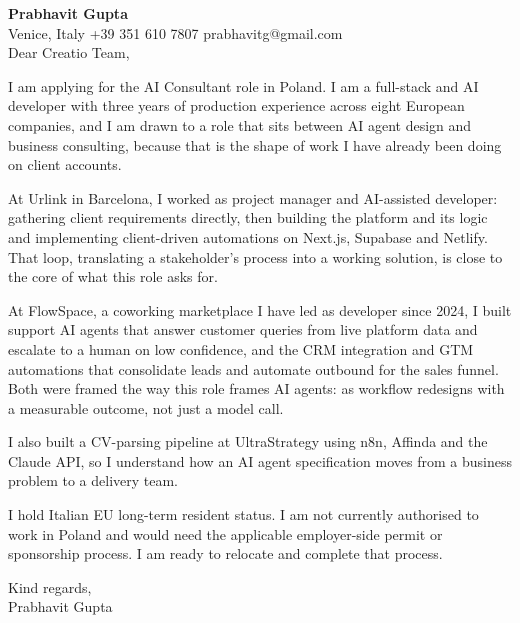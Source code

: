 \documentclass[a4paper,10.5pt]{article}
\begin{document}
\textbf{Prabhavit Gupta}\\
Venice, Italy \textbar{} +39 351 610 7807 \textbar{} prabhavitg@gmail.com\\[10pt]
Dear Creatio Team,

I am applying for the AI Consultant role in Poland. I am a full-stack and AI developer with three years of production experience across eight European companies, and I am drawn to a role that sits between AI agent design and business consulting, because that is the shape of work I have already been doing on client accounts.

At Urlink in Barcelona, I worked as project manager and AI-assisted developer: gathering client requirements directly, then building the platform and its logic and implementing client-driven automations on Next.js, Supabase and Netlify. That loop, translating a stakeholder's process into a working solution, is close to the core of what this role asks for.

At FlowSpace, a coworking marketplace I have led as developer since 2024, I built support AI agents that answer customer queries from live platform data and escalate to a human on low confidence, and the CRM integration and GTM automations that consolidate leads and automate outbound for the sales funnel. Both were framed the way this role frames AI agents: as workflow redesigns with a measurable outcome, not just a model call.

I also built a CV-parsing pipeline at UltraStrategy using n8n, Affinda and the Claude API, so I understand how an AI agent specification moves from a business problem to a delivery team.

I hold Italian EU long-term resident status. I am not currently authorised to work in Poland and would need the applicable employer-side permit or sponsorship process. I am ready to relocate and complete that process.

Kind regards,\\
Prabhavit Gupta
\end{document}
